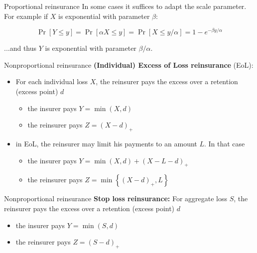 \documentclass[11pt]{beamer}
\begin{document}
\begin{frame}{Proportional reinsurance}
In some cases it suffices to adapt the scale parameter. For example if $X$ is exponential with parameter $\beta$:

\vfill

 $$\Pr[Y\le y]=\Pr[\alpha X \le y]=\Pr[X \le y/\alpha] = 1-e^{-\beta y / \alpha}$$
  
\vfill   
   
    ...and thus $Y$ is exponential with parameter $\beta/\alpha$.

\end{frame}
\begin{frame}[t]{Nonproportional reinsurance}
  \textbf{(Individual) Excess of Loss reinsurance} (EoL):
  \begin{itemize}
  \item For each individual loss $X$, the reinsurer pays the excess over a \alert{retention (excess point) $d$}
    \begin{itemize}
    \item the insurer pays $Y=\min(X,d)$
    \item the reinsurer pays $Z=(X-d)_+$
    \end{itemize}
  \vfill
  \item in EoL, the reinsurer may limit his payments to an amount $L$. In that case
    \begin{itemize}
    \item the insurer pays $Y=\min(X,d)+(X-L-d)_+$
    \item the reinsurer pays $Z=\min\left\{(X-d)_+,L\right\}$
    \end{itemize}
  \end{itemize}
 
\end{frame}
\begin{frame}{Nonproportional reinsurance}
   \textbf{Stop loss reinsurance:} For aggregate loss $S$, the reinsurer pays the excess over a \alert{retention (excess point) $d$}
    \begin{itemize}
    \item the insurer pays $Y=\min(S,d)$
    \item the reinsurer pays $Z=(S-d)_+$
    \end{itemize}
\end{frame}
\end{document}
